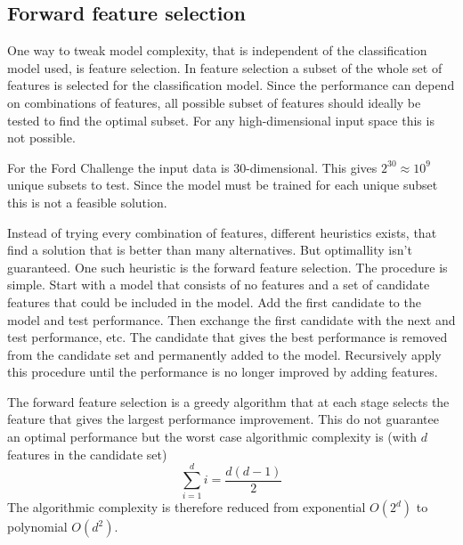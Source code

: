 \subsection{Forward feature selection}
One way to tweak model complexity, that is independent of the classification model used, is feature selection. In feature selection a subset of the whole set of features is selected for the classification model. Since the performance can depend on combinations of features, all possible subset of features should ideally be tested to find the optimal subset. For any high-dimensional input space this is not possible.
\begin{Exa}
    For the Ford Challenge the input data is 30-dimensional. This gives $2^{30}\approx10^9$ unique subsets to test. Since the model must be trained for each unique subset this is not a feasible solution.
\end{Exa}
Instead of trying every combination of features, different heuristics exists, that find a solution that is better than many alternatives. But optimallity isn't guaranteed. One such heuristic is the forward feature selection. The procedure is simple. Start with a model that consists of no features and a set of candidate features that could be included in the model. Add the first candidate to the model and test performance. Then exchange the first candidate with the next and test performance, etc. The candidate that gives the best performance is removed from the candidate set and permanently added to the model. Recursively apply this procedure until the performance is no longer improved by adding features. \par
The forward feature selection is a greedy algorithm that at each stage selects the feature that gives the largest performance improvement. This do not guarantee an optimal performance but the worst case algorithmic complexity is (with $d$ features in the candidate set)
\[
    \sum_{i=1}^d i = \frac{d(d-1)}{2}
\]
The algorithmic complexity is therefore reduced from exponential $O(2^d)$ to polynomial $O(d^2)$.

